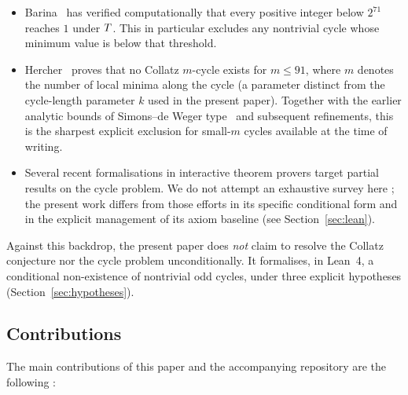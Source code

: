 \begin{itemize}
  \item Barina~\cite{Barina2025} has verified computationally that every
        positive integer below \(2^{71}\) reaches \(1\) under
        \(T\). This in particular excludes any nontrivial cycle
        whose minimum value is below that threshold.
  \item Hercher~\cite{Hercher2023} proves that no Collatz \(m\)-cycle
        exists for \(m \leq 91\), where \(m\) denotes the number of
        local minima along the cycle (a parameter distinct from the
        cycle-length parameter \(k\) used in the present paper).
        Together with the earlier analytic bounds of Simons--de Weger
        type~\cite{SimonsDeWeger2005} and subsequent refinements, this
        is the sharpest explicit exclusion for small-\(m\) cycles
        available at the time of writing.
  \item Several recent formalisations in interactive theorem provers
        target partial results on the cycle problem. We do not attempt
        an exhaustive survey here ;
        the present work differs from those efforts in its specific
        conditional form and in the explicit management of its axiom
        baseline (see Section~\ref{sec:lean}).
\end{itemize}

Against this backdrop, the present paper does \emph{not} claim to resolve
the Collatz conjecture nor the cycle problem unconditionally. It
formalises, in Lean~4, a conditional non-existence of nontrivial odd
cycles, under three explicit hypotheses (Section~\ref{sec:hypotheses}).

\subsection{Contributions}


The main contributions of this paper and the accompanying repository are
the following :

